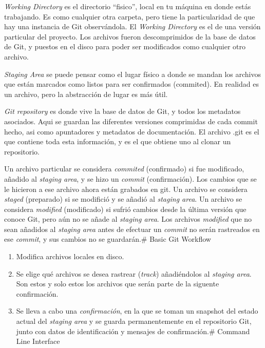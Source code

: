 \documentclass[spanish, 12pt, a4paper]{article}
\begin{document}
\emph{Working Directory} es el directorio ``fisico'', local en tu
máquina en donde estás trabajando. Es como cualquier otra carpeta, pero
tiene la particularidad de que hay una instancia de Git observándola. El
\emph{Working Directory} es el de una versión particular del proyecto.
Los archivos fueron descomprimidos de la base de datos de Git, y puestos
en el disco para poder ser modificados como cualquier otro archivo.

\emph{Staging Area} se puede pensar como el lugar físico a donde se
mandan los archivos que están marcados como listos para ser confirmados
(commited). En realidad es un archivo, pero la abstracción de lugar es
más útil.

\emph{Git repository} es donde vive la base de datos de Git, y todos los
metadatos asociados. Aqui se guardan las diferentes versiones
comprimidas de cada commit hecho, asi como apuntadores y metadatos de
documentación. El archivo .git es el que contiene toda esta información,
y es el que obtiene uno al clonar un repositorio.

Un archivo particular se considera \emph{commited} (confirmado) si fue
modificado, añadido al \emph{staging area}, y se hizo un \emph{commit}
(confirmación). Los cambios que se le hicieron a ese archivo ahora están
grabados en git. Un archivo se considera \emph{staged} (preparado) si se
modifició y se añadió al \emph{staging area}. Un archivo se considera
\emph{modified} (modificado) si sufrió cambios desde la última versión
que conoce Git, pero aún no se añade al \emph{staging area}. Los
archivos \emph{modified} que no sean añadidos al \emph{staging area}
antes de efectuar un \emph{commit} no serán rastreados en ese
\emph{commit}, y sus cambios no se guardarán.\# Basic Git Workflow

\begin{enumerate}
\def\labelenumi{\arabic{enumi}.}
\item
  Modifica archivos locales en disco.
\item
  Se elige qué archivos se desea rastrear (\emph{track}) añadiéndolos al
  \emph{staging area}. Son estos y solo estos los archivos que serán
  parte de la siguente confirmación.
\item
  Se lleva a cabo una \emph{confirmación}, en la que se toman un
  snapshot del estado actual del \emph{staging area} y se guarda
  permanentemente en el repositorio Git, junto con datos de
  identificación y mensajes de confirmación.\# Command Line Interface
\end{enumerate}
\end{document}
